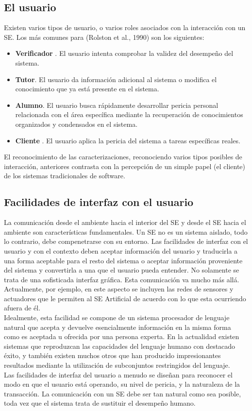 \subsection{El usuario}

Existen varios tipos de usuario, o varios roles asociados con la interacción con un SE.  Los más comunes para (Rolston et al., 1990) son los siguientes:
\begin{itemize}
    \item \textbf{Verificador}	. El usuario intenta comprobar la validez del desempeño del sistema.
     \item 	\textbf{Tutor}. El usuario da información adicional al sistema o modifica el conocimiento que ya está presente en el sistema.
     \item 	\textbf{Alumno}. El usuario busca rápidamente desarrollar pericia personal relacionada con el área específica mediante la recuperación de conocimientos organizados y condensados en el sistema.
     \item \textbf{Cliente}	. El usuario aplica la pericia del sistema a tareas específicas reales.
\end{itemize}
El reconocimiento de las caracterizaciones, reconociendo varios tipos posibles de interacción, anteriores contrasta con la percepción de un simple papel (el cliente) de los sistemas tradicionales de software.
\subsection{	Facilidades de interfaz con el usuario}
La comunicación desde el ambiente hacia el interior del SE y desde el SE hacia el ambiente son características fundamentales.  Un SE no es un sistema aislado, todo lo contrario, debe compenetrarse con su entorno. Las facilidades de interfaz con el usuario y con el contexto deben aceptar información del usuario y traducirla a una forma aceptable para el resto del sistema o aceptar información proveniente del sistema y convertirla a una que el usuario pueda entender. No solamente se trata de una sofisticada interfaz gráfica.  Esta comunicación va mucho más allá. Actualmente, por ejemplo, en este aspecto se incluyen las redes de sensores y actuadores que le permiten al SE Artificial de acuerdo con lo que esta ocurriendo afuera de él.\\
Idealmente, esta facilidad se compone de un sistema procesador de lenguaje natural que acepta y  devuelve esencialmente información en la misma forma como es aceptada u ofrecida por una persona experta. En la actualidad existen sistemas que reproduzcan las capacidades del  lenguaje humano con destacado éxito, y también existen muchos otros que han producido impresionantes resultados mediante la utilización de subconjuntos restringidos del lenguaje.\\
Las facilidades de interfaz del usuario a menudo se diseñan para reconocer el modo en que el usuario está operando, su nivel de pericia, y la naturaleza de la transacción. La comunicación con un SE debe ser tan natural como sea posible, toda vez que el sistema trata de sustituir el desempeño humano.
